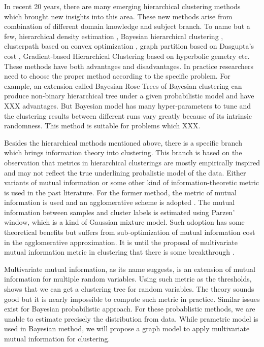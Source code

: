 In recent 20 years, there are many emerging hierarchical clustering methods which brought new insights into this area. These new methods arise from combination of different domain knowledge and
subject branch. To name but a few, hierarchical density estimation \citep{hde}, Bayesian hierarchical clustering \citep{bhc},
clusterpath based on convex optimization \citep{hocking2011clusterpath},
graph partition based on Dasgupta's cost \citep{dasgupta2016cost},
Gradient-based Hierarchical Clustering based on hyperbolic gemetry \citep{hyperbolic} etc.
These methods have both advantages and disadvantages.
In practice researchers need to choose the proper method according to the specific problem.
For example, an extension called Bayesian Rose Trees of Bayesian clustering
can produce non-binary hierarchical tree
under a given probabilistic model \citep{blundell2011discovering} and have XXX advantages.
But Bayesian model has many hyper-parameters to tune and the clustering results between different runs vary greatly because of its intrinsic randomness.
This method is suitable for problems which XXX.

Besides the hierarchical methods mentioned above, there is a specific branch which brings information theory into clustering. This branch is based on the observation that metrics in hierarchical clusterings
are mostly empirically inspired and may not reflect the true underlining probalistic model of the data.
Either variants of mutual information or some other kind of information-theoretic metric \citep{ic2002}  is used in the past literature. For the former method, the metric of mutual information is used and an agglomerative scheme is adopted \citep{mim}. The mutual information between samples and cluster labels is estimated using Parzen' window, which is a kind of Gaussian mixture model. Such adoption
has some theoretical benefits but suffers from sub-optimization of mutual information cost in the agglomerative approximation. It is until the proposal of multivariate mutual information metric in clustering that there is some breakthrough \citep{ic2016}.

Multivariate mutual information, as its name suggests, is an extension of mutual information for multiple
random variables. Using such metric as the thresholds, \citet{ic2016} shows that we can get a clustering
tree for random variables. The theory sounds good but it is nearly impossible to compute such metric
in practice. Similar issues exist for Bayesian probabilistic approach. For these probablistic methods, we
are unable to estimate precisely the distribution from data. While prametric model is used in Bayesian
method, we will propose a graph model to apply multivariate mutual information for clustering.

